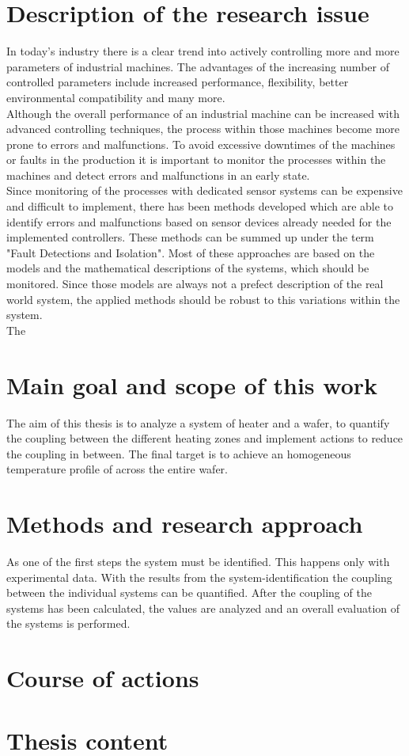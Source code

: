 \renewcommand{\thepage}{\arabic{page}} \setcounter{page}{1}

\section*{Description of the research issue}
In today's industry there is a clear trend into actively controlling more and more parameters of industrial machines. The advantages of the increasing number of controlled parameters include increased performance, flexibility, better environmental compatibility and many more.  \\ 
Although the overall performance of an industrial machine can be increased with advanced controlling techniques, the process within those machines become more prone to errors and malfunctions. To avoid excessive downtimes of the machines or faults in the production it is important to monitor the processes within the machines and detect errors and malfunctions in an early state.\\
Since monitoring of the processes with dedicated sensor systems can be expensive and difficult to implement, there has been methods developed which are able to identify errors and malfunctions based on sensor devices already needed for the implemented controllers. These methods can be summed up under the term "Fault Detections and Isolation". Most of these approaches are based on the models and the mathematical descriptions of the systems, which should be monitored. Since those models are always not a prefect description of the real world system, the applied methods should be robust to this variations within the system.\\
The   

\section*{Main goal and scope of this work}
The aim of this thesis is to analyze a system of heater and a wafer, to quantify the coupling between the different heating zones and implement actions to reduce the coupling in between. The final target is to achieve an homogeneous temperature profile of across the entire wafer.
 
\section*{Methods and research approach}
As one of the first steps the system must be identified. This happens only with experimental data. With the results from the system-identification the coupling between the individual systems can be quantified. After the coupling of the systems has been calculated, the values are analyzed and an overall evaluation of the systems is performed.

\section*{Course of actions}

\section*{Thesis content}